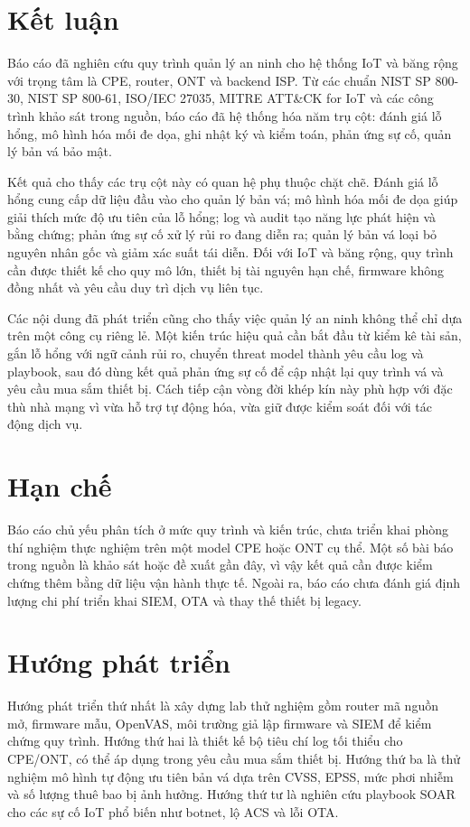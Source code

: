 \documentclass[../DoAn.tex]{subfiles}
\begin{document}
\section{Kết luận}
Báo cáo đã nghiên cứu quy trình quản lý an ninh cho hệ thống IoT và băng rộng với trọng tâm là CPE, router, ONT và backend ISP. Từ các chuẩn NIST SP 800-30, NIST SP 800-61, ISO/IEC 27035, MITRE ATT\&CK for IoT và các công trình khảo sát trong nguồn, báo cáo đã hệ thống hóa năm trụ cột: đánh giá lỗ hổng, mô hình hóa mối đe dọa, ghi nhật ký và kiểm toán, phản ứng sự cố, quản lý bản vá bảo mật.

Kết quả cho thấy các trụ cột này có quan hệ phụ thuộc chặt chẽ. Đánh giá lỗ hổng cung cấp dữ liệu đầu vào cho quản lý bản vá; mô hình hóa mối đe dọa giúp giải thích mức độ ưu tiên của lỗ hổng; log và audit tạo năng lực phát hiện và bằng chứng; phản ứng sự cố xử lý rủi ro đang diễn ra; quản lý bản vá loại bỏ nguyên nhân gốc và giảm xác suất tái diễn. Đối với IoT và băng rộng, quy trình cần được thiết kế cho quy mô lớn, thiết bị tài nguyên hạn chế, firmware không đồng nhất và yêu cầu duy trì dịch vụ liên tục.

Các nội dung đã phát triển cũng cho thấy việc quản lý an ninh không thể chỉ dựa trên một công cụ riêng lẻ. Một kiến trúc hiệu quả cần bắt đầu từ kiểm kê tài sản, gắn lỗ hổng với ngữ cảnh rủi ro, chuyển threat model thành yêu cầu log và playbook, sau đó dùng kết quả phản ứng sự cố để cập nhật lại quy trình vá và yêu cầu mua sắm thiết bị. Cách tiếp cận vòng đời khép kín này phù hợp với đặc thù nhà mạng vì vừa hỗ trợ tự động hóa, vừa giữ được kiểm soát đối với tác động dịch vụ.

\section{Hạn chế}
Báo cáo chủ yếu phân tích ở mức quy trình và kiến trúc, chưa triển khai phòng thí nghiệm thực nghiệm trên một model CPE hoặc ONT cụ thể. Một số bài báo trong nguồn là khảo sát hoặc đề xuất gần đây, vì vậy kết quả cần được kiểm chứng thêm bằng dữ liệu vận hành thực tế. Ngoài ra, báo cáo chưa đánh giá định lượng chi phí triển khai SIEM, OTA và thay thế thiết bị legacy.

\section{Hướng phát triển}
Hướng phát triển thứ nhất là xây dựng lab thử nghiệm gồm router mã nguồn mở, firmware mẫu, OpenVAS, môi trường giả lập firmware và SIEM để kiểm chứng quy trình. Hướng thứ hai là thiết kế bộ tiêu chí log tối thiểu cho CPE/ONT, có thể áp dụng trong yêu cầu mua sắm thiết bị. Hướng thứ ba là thử nghiệm mô hình tự động ưu tiên bản vá dựa trên CVSS, EPSS, mức phơi nhiễm và số lượng thuê bao bị ảnh hưởng. Hướng thứ tư là nghiên cứu playbook SOAR cho các sự cố IoT phổ biến như botnet, lộ ACS và lỗi OTA.
\end{document}
